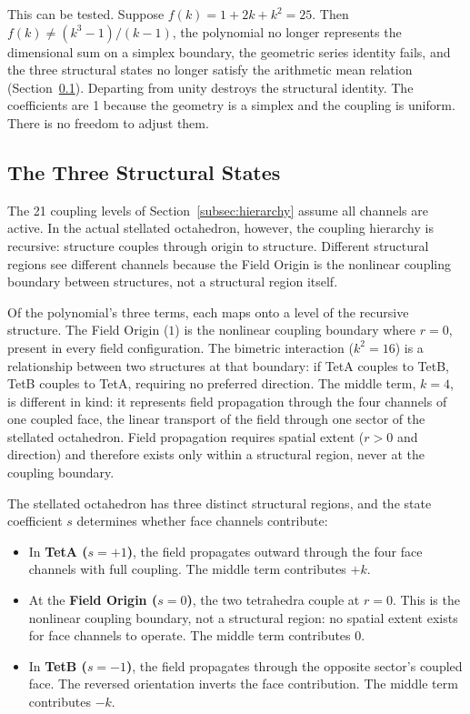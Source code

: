 \documentclass[aps,prd,preprint,superscriptaddress,showpacs,preprintnumbers,amsmath,amssymb,nofootinbib]{revtex4-2}
\begin{document}
This can be tested. Suppose $f(k) = 1 + 2k + k^2 = 25$. Then $f(k) \neq (k^3 - 1)/(k - 1)$, the polynomial no longer represents the dimensional sum on a simplex boundary, the geometric series identity fails, and the three structural states no longer satisfy the arithmetic mean relation (Section~\ref{subsec:states}). Departing from unity destroys the structural identity. The coefficients are 1 because the geometry is a simplex and the coupling is uniform. There is no freedom to adjust them.

\subsection{The Three Structural States}
\label{subsec:states}

The 21 coupling levels of Section~\ref{subsec:hierarchy} assume all channels are active. In the actual stellated octahedron, however, the coupling hierarchy is recursive: structure couples through origin to structure. Different structural regions see different channels because the Field Origin is the nonlinear coupling boundary between structures, not a structural region itself.

Of the polynomial's three terms, each maps onto a level of the recursive structure. The Field Origin ($1$) is the nonlinear coupling boundary where $r = 0$, present in every field configuration. The bimetric interaction ($k^2 = 16$) is a relationship between two structures at that boundary: if TetA couples to TetB, TetB couples to TetA, requiring no preferred direction. The middle term, $k = 4$, is different in kind: it represents field propagation through the four channels of one coupled face, the linear transport of the field through one sector of the stellated octahedron. Field propagation requires spatial extent ($r > 0$ and direction) and therefore exists only within a structural region, never at the coupling boundary.

The stellated octahedron has three distinct structural regions, and the state coefficient $s$ determines whether face channels contribute:

\begin{itemize}
\item In \textbf{TetA ($s = +1$)}, the field propagates outward through the four face channels with full coupling. The middle term contributes $+k$.
\item At the \textbf{Field Origin ($s = 0$)}, the two tetrahedra couple at $r = 0$. This is the nonlinear coupling boundary, not a structural region: no spatial extent exists for face channels to operate. The middle term contributes $0$.
\item In \textbf{TetB ($s = -1$)}, the field propagates through the opposite sector's coupled face. The reversed orientation inverts the face contribution. The middle term contributes $-k$.
\end{itemize}
\end{document}
